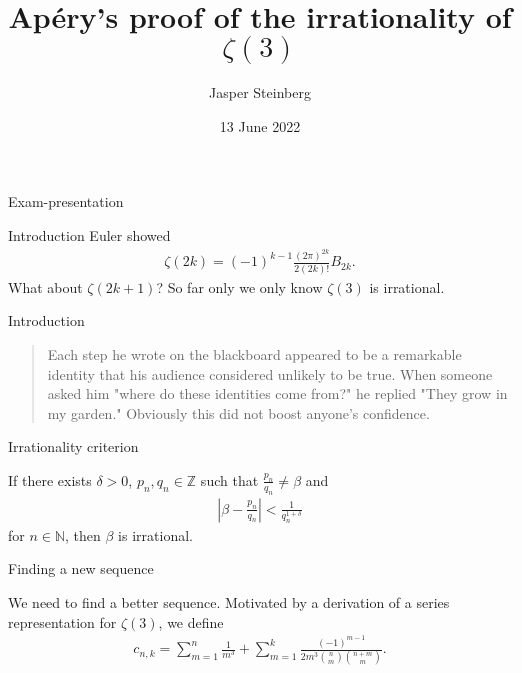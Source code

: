 \documentclass{beamer}
\title[Irrationality of $\zeta(3)$]{Apéry's proof of the irrationality of $\zeta(3)$}
\author{Jasper Steinberg}
\institute[NTNU]{NTNU}
\date{13 June 2022}
\newcommand{\N}{\mathbb{{N}}}
\newcommand{\Z}{\mathbb{Z}}
\begin{document}
\begin{frame}
\begin{center}
{Exam-presentation}
\end{center}
\titlepage
\end{frame}


\begin{frame}{Introduction}{}
Euler showed 
\begin{align*}
    \zeta(2k) = (-1)^{k-1}\frac{(2\pi)^{2k}}{2(2k)!}B_{2k}.
\end{align*}
\pause
What about $\zeta(2k+1)$?
\pause
So far only we only know $\zeta(3)$ is irrational. 

\end{frame}
\begin{frame}{Introduction}{}

\begin{quote}

Each step he wrote on the blackboard appeared to be a remarkable identity that his audience considered unlikely to be true. When someone asked him "where do these identities come from?" he replied "They grow in my garden." Obviously this did not boost anyone's confidence. 
    
\end{quote}


\end{frame}



\begin{frame}{Irrationality criterion}{}

If there exists $\delta>0$, $p_n, q_n \in \Z$ such that $\frac{p_n}{q_n} \neq \beta$ and 
\begin{align*}
    \left|\beta - \frac{p_n}{q_n}\right| < \frac{1}{q_n^{1+\delta}}
\end{align*}
for $n\in \N$, then $\beta$ is irrational. 


\end{frame}



\begin{frame}{Finding a new sequence}{}

We need to find a better sequence. Motivated by a derivation of a series representation for $\zeta(3)$, we define
\begin{align*}
    c_{n,k} =
    \sum_{m=1}^n\frac{1}{m^3} + \sum_{m=1}^k \frac{(-1)^{m-1}}{2m^3\binom{n}{m}\binom{n+m}{m}}.
\end{align*}
\end{frame}
\end{document}
